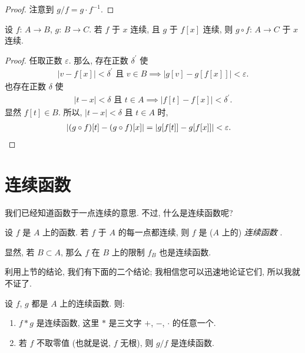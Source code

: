 \begin{proof}
    注意到 $g/f = g \cdot f^{-1}$.
\end{proof}

\begin{theorem}
    设 $f$: $A \to B$, $g$: $B \to C$.
    若 $f$ 于 $x$ 连续, 且 $g$ 于 $f[x]$ 连续,
    则 $g \circ f$: $A \to C$ 于 $x$ 连续.
\end{theorem}

\begin{proof}
    任取正数 $\varepsilon$.
    那么, 存在正数 $\delta^{\prime}$ 使
    \begin{align*}
        \text{$|v - f[x]| < \delta^{\prime}$ 且 $v \in B$} \implies |g[v] - g[f[x]]| < \varepsilon.
    \end{align*}
    也存在正数 $\delta$ 使
    \begin{align*}
        \text{$|t - x| < \delta$ 且 $t \in A$} \implies |f[t] - f[x]| < \delta^{\prime}.
    \end{align*}
    显然 $f[t] \in B$.
    所以, $|t - x| < \delta$ 且 $t \in A$ 时,
    \begin{align*}
         & {|(g \circ f)[t] - (g \circ f)[x]| = |g[f[t]] - g[f[x]]| < \varepsilon.} \qedhere
    \end{align*}
\end{proof}

\section{连续函数}

我们已经知道函数于一点连续的意思.
不过, 什么是连续函数呢?

\begin{definition}
    设 $f$ 是 $A$ 上的函数.
    若 $f$ 于 $A$ 的每一点都连续,
    则 $f$ 是 ($A$ 上的) \emph{连续函数}%
    .
\end{definition}

\begin{remark}
    显然, 若 $B \subset A$,
    那么 $f$ 在 $B$ 上的限制 $f_B$ 也是连续函数.
\end{remark}

利用上节的结论, 我们有下面的二个结论;
我相信您可以迅速地论证它们, 所以我就不证了.

\begin{theorem}
    设 $f$, $g$ 都是 $A$ 上的连续函数. 则:
    \begin{enumerate}
        \item $f \ast g$ 是连续函数,
              这里 $\ast$ 是三文字 $+$, $-$, $\cdot$ 的任意一个.
        \item 若 $f$ 不取零值 (也就是说, $f$ 无根),
              则 $g/f$ 是连续函数.
    \end{enumerate}
\end{theorem}

